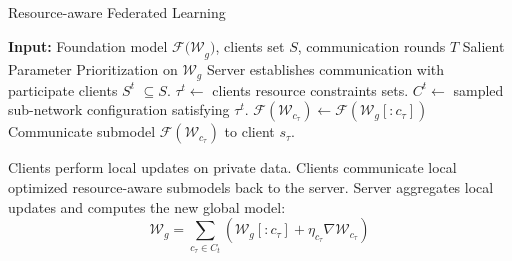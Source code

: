 
\begin{algorithm}[t]
\caption{Resource-aware Federated Learning}
\label{algo:raffm}
\begin{algorithmic}
\State \textbf{Input:} Foundation model $\mathcal{F(W}_g)$, clients set $S$, communication rounds $T$
\State Salient Parameter Prioritization on $\mathcal{W}_g$
\State Server establishes communication with participate clients $S^t$ $\subseteq S$.
\State $\tau^t \leftarrow$ clients resource constraints sets.
\State $C^t \leftarrow$ sampled sub-network configuration satisfying $\tau^t$.
\State $\mathcal{F}(\mathcal{W}_{c_\tau}) \leftarrow \mathcal{F}(\mathcal{W}_g[:{c_\tau}])$
\State Communicate submodel $\mathcal{F}(\mathcal{W}_{c_\tau})$ to client $s_\tau$.
\EndFor

\State Clients perform local updates on private data.
\State Clients communicate local optimized resource-aware submodels back to the server.
\State Server aggregates local updates and computes the new global model:
\begin{equation*}
\mathcal{W}_g =  \sum_{{c_\tau} \in C_t}( \mathcal{W}_g[:c_\tau]  + \eta_{c_\tau} \nabla \mathcal{W}_{c_\tau})
\end{equation*}
\EndFor
\end{algorithmic}
\end{algorithm}

